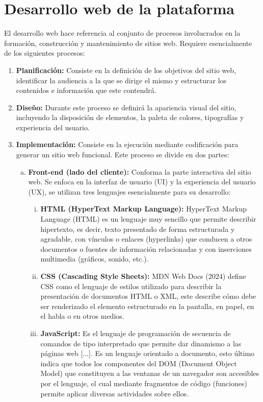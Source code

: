 \documentclass[12pt,a4paper]{report}
\begin{document}
\section{Desarrollo web de la plataforma}

El desarrollo web hace referencia al conjunto de procesos involucrados en la formación, construcción y mantenimiento de sitios web. Requiere esencialmente de los siguientes procesos:

\begin{enumerate}
\item \textbf{Planificación:} Consiste en la definición de los objetivos del sitio web, identificar la audiencia a la que se dirige el mismo y estructurar los contenidos e información que este contendrá.

\item \textbf{Diseño:} Durante este proceso se definirá la apariencia visual del sitio, incluyendo la disposición de elementos, la paleta de colores, tipografías y experiencia del usuario.

\item \textbf{Implementación:} Consiste en la ejecución mediante codificación para generar un sitio web funcional. Este proceso se divide en dos partes:
\begin{enumerate}[a.]
\item \textbf{Front-end (lado del cliente):} Conforma la parte interactiva del sitio web. Se enfoca en la interfaz de usuario (UI) y la experiencia del usuario (UX), se utilizan tres lenguajes esencialmente para su desarrollo:
\begin{enumerate}[i.]
\item \textbf{HTML (HyperText Markup Language):} HyperText Markup Language (HTML) es un lenguaje muy sencillo que permite describir hipertexto, es decir, texto presentado de forma estructurada y agradable, con vínculos o enlaces (hyperlinks) que conducen a otros documentos o fuentes de información relacionadas y con inserciones multimedia (gráficos, sonido, etc.).

\item \textbf{CSS (Cascading Style Sheets):} MDN Web Docs (2024) define CSS como el lenguaje de estilos utilizado para describir la presentación de documentos HTML o XML, este describe cómo debe ser renderizado el elemento estructurado en la pantalla, en papel, en el habla o en otros medios.

\item \textbf{JavaScript:} Es el lenguaje de programación de secuencia de comandos de tipo interpretado que permite dar dinamismo a las páginas web [...]. Es un lenguaje orientado a documento, esto último indica que todos los componentes del DOM (Document Object Model) que constituyen a las ventanas de un navegador son accesibles por el lenguaje, el cual mediante fragmentos de código (funciones) permite aplicar diversas actividades sobre ellos.
\end{enumerate}


\end{enumerate}
\end{enumerate}
\end{document}
